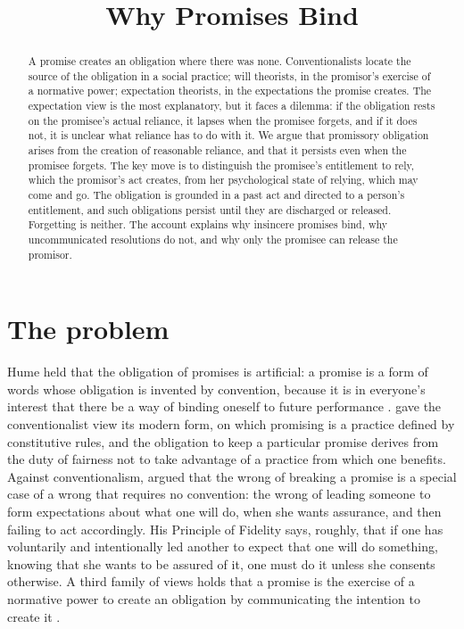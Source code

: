 \documentclass{situationist-preprint}
\title{Why Promises Bind}
\begin{document}
\maketitle

\begin{abstract}
A promise creates an obligation where there was none. Conventionalists locate the source of the obligation in a social practice; will theorists, in the promisor's exercise of a normative power; expectation theorists, in the expectations the promise creates. The expectation view is the most explanatory, but it faces a dilemma: if the obligation rests on the promisee's actual reliance, it lapses when the promisee forgets, and if it does not, it is unclear what reliance has to do with it. We argue that promissory obligation arises from the creation of reasonable reliance, and that it persists even when the promisee forgets. The key move is to distinguish the promisee's entitlement to rely, which the promisor's act creates, from her psychological state of relying, which may come and go. The obligation is grounded in a past act and directed to a person's entitlement, and such obligations persist until they are discharged or released. Forgetting is neither. The account explains why insincere promises bind, why uncommunicated resolutions do not, and why only the promisee can release the promisor.
\end{abstract}

\section{The problem}

Hume held that the obligation of promises is artificial: a promise is a form of words whose obligation is invented by convention, because it is in everyone's interest that there be a way of binding oneself to future performance \citep[3.2.5]{Hume1739}. \citet{Rawls1955} gave the conventionalist view its modern form, on which promising is a practice defined by constitutive rules, and the obligation to keep a particular promise derives from the duty of fairness not to take advantage of a practice from which one benefits. Against conventionalism, \citet{Scanlon1990,Scanlon1998} argued that the wrong of breaking a promise is a special case of a wrong that requires no convention: the wrong of leading someone to form expectations about what one will do, when she wants assurance, and then failing to act accordingly. His Principle of Fidelity says, roughly, that if one has voluntarily and intentionally led another to expect that one will do something, knowing that she wants to be assured of it, one must do it unless she consents otherwise. A third family of views holds that a promise is the exercise of a normative power to create an obligation by communicating the intention to create it \citep{Raz1977,Owens2012}.
\end{document}
